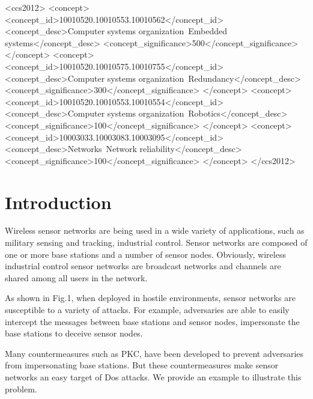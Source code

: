 \documentclass{sig-alternate-05-2015}
\begin{document}
%
%
\begin{CCSXML}
<ccs2012>
 <concept>
  <concept_id>10010520.10010553.10010562</concept_id>
  <concept_desc>Computer systems organization~Embedded systems</concept_desc>
  <concept_significance>500</concept_significance>
 </concept>
 <concept>
  <concept_id>10010520.10010575.10010755</concept_id>
  <concept_desc>Computer systems organization~Redundancy</concept_desc>
  <concept_significance>300</concept_significance>
 </concept>
 <concept>
  <concept_id>10010520.10010553.10010554</concept_id>
  <concept_desc>Computer systems organization~Robotics</concept_desc>
  <concept_significance>100</concept_significance>
 </concept>
 <concept>
  <concept_id>10003033.10003083.10003095</concept_id>
  <concept_desc>Networks~Network reliability</concept_desc>
  <concept_significance>100</concept_significance>
 </concept>
</ccs2012>  
\end{CCSXML}
%



%

%
%

%
%
\printccsdesc



\section{Introduction}
Wireless sensor networks are being used in a wide variety of applications, such as military sensing and tracking, industrial control. Sensor networks are composed of one or more base stations and a number of sensor nodes. Obviously, wireless industrial control sensor networks are broadcast networks and channels are shared among all users in the network. 

As shown in Fig.1, when deployed in hostile environments, sensor networks are susceptible to a variety of attacks. For example, adversaries are able to easily intercept the messages between base stations and sensor nodes, impersonate the base stations to deceive sensor nodes. 

Many countermeasures such as PKC, have been developed to prevent adversaries from impersonating base stations. But these countermeasures make sensor networks an easy target of Dos attacks. We provide an example to illustrate this problem. 
\end{document}
